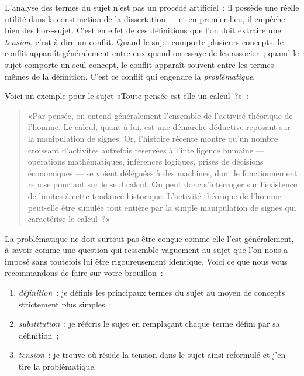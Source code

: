 \documentclass[a4paper,11pt]{article}
\newcommand{\cad}{c'est-à-dire}
\begin{document}
L'analyse des termes du sujet n'est pas un procédé artificiel~: il
possède une réelle utilité dans la construction de la dissertation ---
et en premier lieu, il empêche bien des hors-sujet. C'est en effet de
ces définitions que l'on doit extraire une \emph{tension}, \cad{} un
conflit. Quand le sujet comporte plusieurs concepts, le conflit apparaît
généralement entre eux quand on essaye de les associer~; quand le sujet
comporte un seul concept, le conflit apparaît souvent entre les termes
mêmes de la définition. C'est ce conflit qui engendre la
\emph{problématique}.

\par

Voici un exemple pour le sujet «Toute pensée est-elle un calcul~?»~:
\begin{quote}
  «Par pensée, on entend généralement l'ensemble de l'activité théorique
  de l'homme. Le calcul, quant à lui, est une démarche déductive
  reposant sur la manipulation de signes. Or, l'histoire récente montre
  qu'un nombre croissant d'activités autrefois réservées à
  l'intelligence humaine --- opérations mathématiques, inférences
  logiques, prises de décisions économiques --- se voient déléguées à
  des machines, dont le fonctionnement repose pourtant sur le seul
  calcul. On peut donc s'interroger sur l'existence de limites à cette
  tendance historique. L'activité théorique de l'homme peut-elle être
  simulée tout entière par la simple manipulation de signes qui
  caractérise le calcul~?»
\end{quote}

\par

La problématique ne doit surtout pas être conçue comme elle l'est
généralement, à savoir comme une question qui ressemble vaguement au
sujet que l'on nous a imposé sans toutefois lui être rigoureusement
identique. Voici ce que nous vous recommandons de faire sur votre
brouillon~:

\begin{enumerate}
\item \emph{définition}~: je définis les principaux termes du sujet au
  moyen de concepts strictement plus simples~;
\item \emph{substitution}~: je réécris le sujet en remplaçant chaque
  terme défini par sa définition~;
\item \emph{tension}~: je trouve où réside la tension dans le sujet
  ainsi reformulé et j'en tire la problématique.
\end{enumerate}
\end{document}
